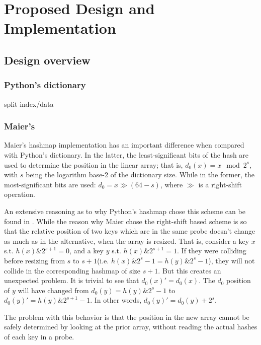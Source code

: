 \chapter{Proposed Design and Implementation}

\cite{cereggii}
\cite{peniocereus-greggii}

\section{Design overview}

\subsection{Python's dictionary}

split index/data


\subsection{Maier's}

Maier's hashmap implementation has an important difference when compared with Python's dictionary.
In the latter, the least-significant bits of the hash are used to determine the position in the linear array; that is, $d_0(x) = x \mod 2^s$, with $s$ being the logarithm base-2 of the dictionary size.
While in the former, the most-significant bits are used: $d_0 = x \gg (64 - s)$, where $\gg$ is a right-shift operation.

An extensive reasoning as to why Python's hashmap chose this scheme can be found in \cite{dict-comment-hash}.
While the reason why Maier chose the right-shift based scheme is so that the relative position of two keys which are in the same probe doesn't change as much as in the alternative, when the array is resized.
That is, consider a key $x$ s.t. $h(x) \mathbin{\&} 2^{s+1} = 0$, and a key $y$ s.t. $h(x) \mathbin{\&} 2^{s+1} = 1$.
If they were colliding before resizing from $s$ to $s+1$(i.e. $h(x) \mathbin{\&} 2^s-1 = h(y) \mathbin{\&} 2^s-1$), they will not collide in the corresponding hashmap of size $s+1$.
But this creates an unexpected problem.
It is trivial to see that $d_0(x)' = d_0(x)$.
The $d_0$ position of $y$ will have changed from $d_0(y) = h(y) \mathbin{\&} 2^s-1$ to $d_0(y)' = h(y) \mathbin{\&} 2^{s+1}-1$.
In other words, $d_0(y)' = d_0(y) + 2^s$.

The problem with this behavior is that the position in the new array cannot be safely determined by looking at the prior array, without reading the actual hashes of each key in a probe.

